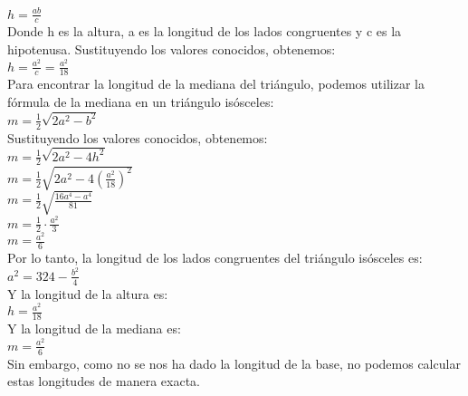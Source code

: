 \documentclass{article}
\begin{document}
$h = \frac{ab}{c}$\\
Donde h es la altura, a es la longitud de los lados congruentes y c es la hipotenusa. Sustituyendo los valores conocidos, obtenemos:\\
$h = \frac{a^2}{c} = \frac{a^2}{18}$\\
Para encontrar la longitud de la mediana del triángulo, podemos utilizar la fórmula de la mediana en un triángulo isósceles:\\
$m = \frac{1}{2} \sqrt{2a^2 - b^2}$\\
Sustituyendo los valores conocidos, obtenemos:\\
$m = \frac{1}{2} \sqrt{2a^2 - 4h^2}$\\
$m = \frac{1}{2} \sqrt{2a^2 - 4\left(\frac{a^2}{18}\right)^2}$\\
$m = \frac{1}{2} \sqrt{\frac{16a^4 - a^4}{81}}$\\
$m = \frac{1}{2} \cdot \frac{a^2}{3}$\\
$m = \frac{a^2}{6}$\\
Por lo tanto, la longitud de los lados congruentes del triángulo isósceles es:\\
$a^2 = 324 - \frac{b^2}{4}$\\
Y la longitud de la altura es:\\
$h = \frac{a^2}{18}$\\
Y la longitud de la mediana es:\\
$m = \frac{a^2}{6}$\\
Sin embargo, como no se nos ha dado la longitud de la base, no podemos calcular estas longitudes de manera exacta.\\
\end{document}

